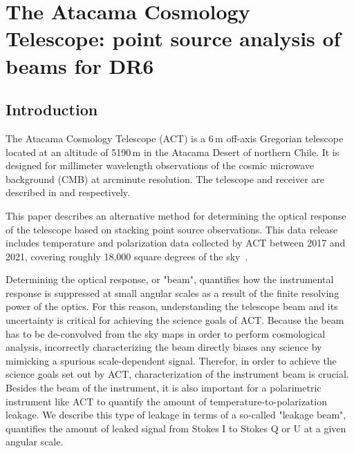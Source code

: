 \chapter{The Atacama Cosmology Telescope: point source analysis of beams for DR6}
\label{ch:actbeams}

\section{\label{sec:act_intro}Introduction}
\setcounter{footnote}{0}

The Atacama Cosmology Telescope (ACT) is a 6\,m off-axis Gregorian telescope located at an altitude of 5190\,m in the Atacama Desert of northern Chile. It is designed for millimeter wavelength observations of the cosmic microwave background (CMB) at arcminute resolution.  The telescope and receiver are described in \cite{fowler_2007} and \cite{thornton_2016} respectively. 

This paper describes an alternative method for determining the optical response of the telescope based on stacking point source observations.  This data release includes temperature and polarization data collected by ACT between 2017 and 2021, covering roughly 18,000 square degrees of the sky~\cite{thornton_2016}.

Determining the optical response, or "beam", quantifies how the instrumental response is suppressed at small angular scales as a result of the finite resolving power of the optics.  For this reason, understanding the telescope beam and its uncertainty is critical for achieving the science goals of ACT.  Because the beam has to be de-convolved from the sky maps in order to perform cosmological analysis, incorrectly characterizing the beam directly biases any science by mimicking a spurious scale-dependent signal.  Therefor, in order to achieve the science goals set out by ACT, characterization of the instrument beam is crucial.  Besides the beam of the instrument, it is also important for a polarimetric instrument like ACT to quantify the amount of temperature-to-polarization leakage. We describe this type of leakage in terms of a so-called "leakage beam", quantifies the amount of leaked signal from Stokes I to Stokes Q or U at a given angular scale.


